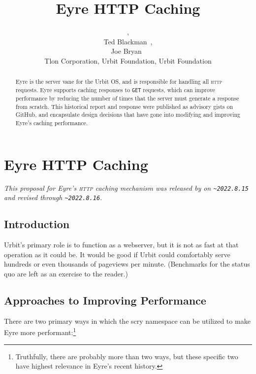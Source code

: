 \documentclass[twoside]{article}
\title{Eyre HTTP Caching}
\author{\patp{palfun-foslup}, \\ Ted Blackman~\patp{rovyns-ricfer}, \\ Joe Bryan~\patp{master-morzod} \\ Tlon Corporation, Urbit Foundation, Urbit Foundation}
\date{}
\begin{document}
\maketitle
\thispagestyle{firststyle}

\begin{abstract}
  Eyre is the server vane for the Urbit OS, and is responsible for handling all \textsc{http} requests.  Eyre supports caching responses to \texttt{GET} requests, which can improve performance by reducing the number of times that the server must generate a response from scratch.  This historical report and response were published as advisory gists on GitHub, and encapsulate design decisions that have gone into modifying and improving Eyre's caching performance.
\end{abstract}

\setcounter{page}{1}

\tableofcontents

\section[Eyre \textsc{http} Caching]{Eyre HTTP Caching}

\noindent\sloppy
\emph{This proposal for Eyre's \textsc{http} caching mechanism was released by  on \texttt{\textasciitilde 2022.8.15} and revised through \texttt{\textasciitilde 2022.8.16}.}

\subsection{Introduction}

Urbit's primary role is to function as a webserver, but it is not as fast at that operation as it could be.  It would be good if Urbit could comfortably serve hundreds or even thousands of pageviews per minute.  (Benchmarks for the status quo are left as an exercise to the reader.)

\subsection{Approaches to Improving Performance}

There are two primary ways in which the scry namespace can be utilized to make Eyre more performant:\footnote{Truthfully, there are probably more than two ways, but these specific two have highest relevance in Eyre's recent history.}
\end{document}
